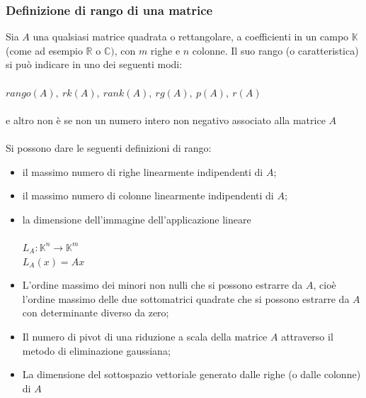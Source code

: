 \documentclass{report}
\begin{document}
\subsubsection{Definizione di rango di una matrice}
Sia $A$ una qualsiasi matrice quadrata o rettangolare, a coefficienti in un campo $\mathbb{K}$ (come ad esempio $\mathbb{R}$ o $\mathbb{C})$, con $m$ righe e $n$ colonne. Il suo rango (o caratteristica) si può indicare in uno dei seguenti modi:
\\
\\
$ rango(A), \ rk(A), \ rank(A), \ rg(A), \ p(A), \ r(A) $ 
\\
\\
e altro non è se non un numero intero non negativo associato alla matrice $A$
\\
\\
Si possono dare le seguenti definizioni di rango:
\\
\begin{itemize}
  \item il massimo numero di righe linearmente indipendenti di $A$;
  \item il massimo numero di colonne linearmente indipendenti di $A$;
  \item{ la dimensione dell'immagine dell'applicazione lineare
  \\
  \\
  $ L_A : \mathbb{K}^n \rightarrow \mathbb{K}^m $
  \\
  $ L_A(x) = Ax $}
  \item L'ordine massimo dei minori non nulli che si possono estrarre da $A$, cioè l'ordine massimo delle due sottomatrici quadrate che si possono estrarre da $A$ con determinante diverso da zero;
  \item Il numero di pivot di una riduzione a scala della matrice $A$ attraverso il metodo di eliminazione gaussiana;
  \item La dimensione del sottospazio vettoriale generato dalle righe (o dalle colonne) di $A$
\end{itemize}
\end{document}
